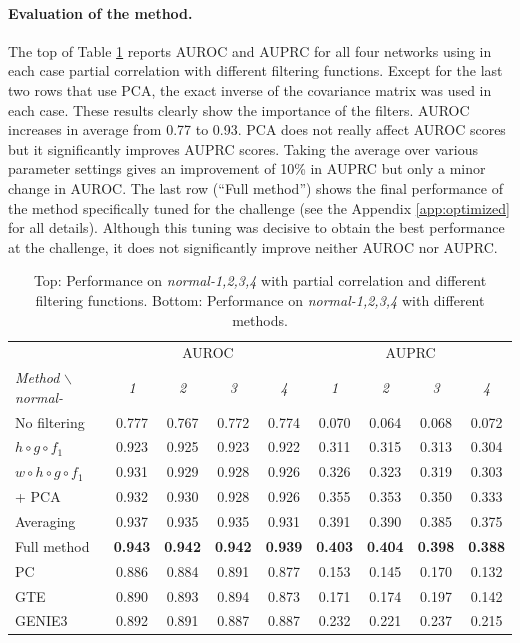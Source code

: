 \documentclass[wcp]{jmlr}
\begin{document}
\paragraph{Evaluation of the method.}

The top of Table \ref{tab:comparison} reports AUROC and AUPRC for all
four networks using in each case partial correlation with different
filtering functions. Except for the last two rows that use PCA, the
exact inverse of the covariance matrix was used in each case. These
results clearly show the importance of the filters. AUROC increases in
average from 0.77 to 0.93. PCA does not really affect AUROC scores but
it significantly improves AUPRC scores. Taking the average over
various parameter settings gives an improvement of 10\% in AUPRC but
only a minor change in AUROC. The last row (``Full method'') shows the
final performance of the method specifically tuned for the challenge
(see the Appendix \ref{app:optimized} for all details). Although this
tuning was decisive to obtain the best performance at the challenge,
it does not significantly improve neither AUROC nor AUPRC.

\begin{table}[t]
\caption{Top: Performance on \textit{normal-1,2,3,4} with partial correlation and different filtering functions.
Bottom: Performance on \textit{normal-1,2,3,4} with different methods.}
\label{tab:comparison}
\centering
\small
\begin{tabular}{| l | c c c c | c c c c |}
\hline
& \multicolumn{4}{c|}{AUROC} & \multicolumn{4}{c|}{AUPRC} \\
\textit{Method} $\backslash$ \textit{normal-} & \textit{1} & \textit{2} & \textit{3} & \textit{4} & \textit{1} & \textit{2} & \textit{3} & \textit{4} \\
\hline
\hline
No  filtering       					& 0.777 & 0.767 & 0.772 & 0.774 & 0.070 & 0.064 & 0.068 & 0.072\\
$ h \circ g \circ f_1$                  & 0.923 & 0.925 & 0.923 & 0.922 & 0.311 & 0.315 & 0.313 & 0.304\\
$ w \circ h \circ g \circ f_1$          & 0.931 & 0.929 & 0.928 & 0.926 & 0.326 & 0.323 & 0.319 & 0.303\\
+ PCA         							& 0.932 & 0.930 & 0.928 & 0.926 & 0.355 & 0.353 & 0.350 & 0.333\\
Averaging           					& 0.937 & 0.935 & 0.935 & 0.931 & 0.391 &  0.390 &  0.385 & 0.375\\
Full method           					& \textbf{0.943} & \textbf{0.942} & \textbf{0.942} & \textbf{0.939} & \textbf{0.403} & \textbf{0.404} & \textbf{0.398} & \textbf{0.388}\\
\hline
PC & 0.886 & 0.884 & 0.891 &  0.877 & 0.153 & 0.145 & 0.170 & 0.132\\
GTE & 0.890 & 0.893 & 0.894 & 0.873 & 0.171 & 0.174 & 0.197 & 0.142\\
GENIE3 & 0.892 & 0.891 & 0.887 & 0.887 & 0.232 & 0.221 & 0.237 & 0.215 \\
\hline
\end{tabular}

\end{table}
\end{document}
